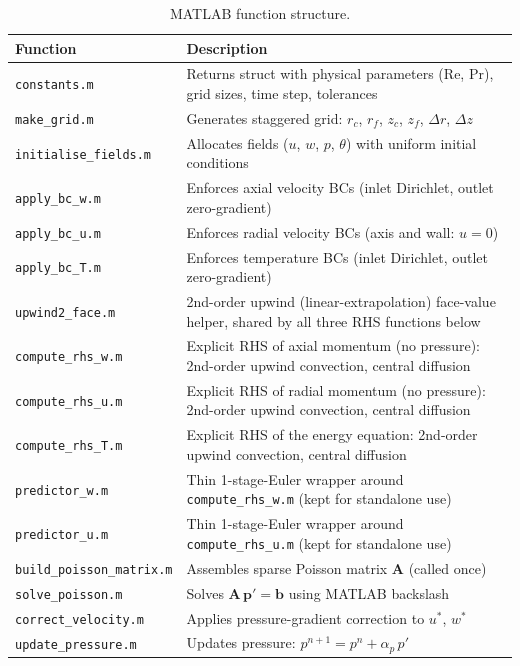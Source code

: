 \documentclass[12pt,a4paper]{article}
\newcommand{\Rey}{\text{Re}}
\newcommand{\Pran}{\text{Pr}}
\begin{document}
\begin{table}[H]
\centering
\caption{MATLAB function structure.}
\label{tab:modules}
\begin{tabular}{lp{8.5cm}}
\toprule
\textbf{Function} & \textbf{Description} \\
\midrule
\texttt{constants.m}          & Returns struct with physical parameters ($\Rey$, $\Pran$), grid sizes, time step, tolerances \\
\texttt{make\_grid.m}         & Generates staggered grid: $r_c$, $r_f$, $z_c$, $z_f$, $\Delta r$, $\Delta z$ \\
\texttt{initialise\_fields.m} & Allocates fields ($u$, $w$, $p$, $\theta$) with uniform initial conditions \\
\texttt{apply\_bc\_w.m}       & Enforces axial velocity BCs (inlet Dirichlet, outlet zero-gradient) \\
\texttt{apply\_bc\_u.m}       & Enforces radial velocity BCs (axis and wall: $u=0$) \\
\texttt{apply\_bc\_T.m}       & Enforces temperature BCs (inlet Dirichlet, outlet zero-gradient) \\
\texttt{upwind2\_face.m}      & 2nd-order upwind (linear-extrapolation) face-value helper, shared by all three RHS functions below \\
\texttt{compute\_rhs\_w.m}    & Explicit RHS of axial momentum (no pressure): 2nd-order upwind convection, central diffusion \\
\texttt{compute\_rhs\_u.m}    & Explicit RHS of radial momentum (no pressure): 2nd-order upwind convection, central diffusion \\
\texttt{compute\_rhs\_T.m}    & Explicit RHS of the energy equation: 2nd-order upwind convection, central diffusion \\
\texttt{predictor\_w.m}       & Thin 1-stage-Euler wrapper around \texttt{compute\_rhs\_w.m} (kept for standalone use) \\
\texttt{predictor\_u.m}       & Thin 1-stage-Euler wrapper around \texttt{compute\_rhs\_u.m} (kept for standalone use) \\
\texttt{build\_poisson\_matrix.m} & Assembles sparse Poisson matrix $\mathbf{A}$ (called once) \\
\texttt{solve\_poisson.m}     & Solves $\mathbf{A}\,\mathbf{p}' = \mathbf{b}$ using MATLAB backslash \\
\texttt{correct\_velocity.m}  & Applies pressure-gradient correction to $u^*$, $w^*$ \\
\texttt{update\_pressure.m}   & Updates pressure: $p^{n+1} = p^n + \alpha_p\,p'$ \\

\end{tabular}
\end{table}
\end{document}
